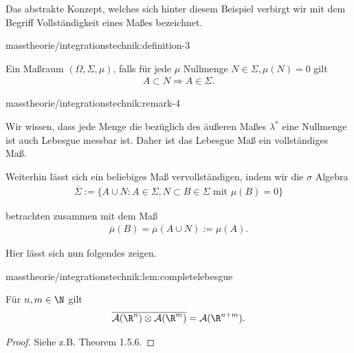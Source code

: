 \documentclass[letterpaper,10pt,german]{jupyterBook}
\begin{document}
\par
Das abstrakte Konzept, welches sich hinter diesem Beispiel verbirgt wir mit dem Begriff Vollständigkeit eines Maßes bezeichnet.
\begin{definition}{}{masstheorie/integrationstechnik:definition-3}



\par
Ein Maßraum \((\Omega,\Sigma,\mu)\), falls für jede \(\mu\) Nullmenge \(N\in\Sigma, \mu(N)=0\) gilt
\begin{align*}
A\subset N \Rightarrow A\in \Sigma.
\end{align*}\end{definition}
\begin{remark}{}{masstheorie/integrationstechnik:remark-4}



\par
Wir wissen, dass jede Menge die bezüglich des äußeren Maßes \(\lambda^\ast\) eine Nullmenge ist auch Lebesgue messbar ist. Daher ist das Lebesgue Maß ein vollständiges Maß.
\end{remark}

\par
Weiterhin lässt sich ein beliebiges Maß vervollständigen, indem wir die \(\sigma\) Algebra
\begin{align*}
\overline{\Sigma}:=\{A\cup N: A\in\Sigma, N\subset B\in\Sigma\text{ mit }\mu(B)=0\}
\end{align*}
\par
betrachten zusammen mit dem Maß
\begin{align*}
\overline{\mu}(B)= \overline{\mu}(A\cup N):= \mu(A).
\end{align*}
\par
Hier lässt sich nun folgendes zeigen.
\begin{lemma}{}{masstheorie/integrationstechnik:lem:completelebesgue}



\par
Für \(n,m\in\N\) gilt
\begin{align*}
\overline{\mathcal{A}(\R^n)\otimes\mathcal{A}(\R^m)}= \mathcal{A}(\R^{n+m}).
\end{align*}\end{lemma}

\begin{proof}
 Siehe z.B. \cite{Bog07} Theorem 1.5.6.
\end{proof}
\end{document}
